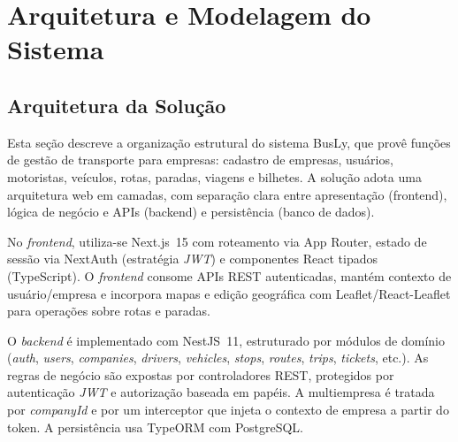 \chapter{Arquitetura e Modelagem do Sistema} \label{cha:arquitetura}

\section{Arquitetura da Solução}
Esta seção descreve a organização estrutural do sistema BusLy, que provê funções de gestão de transporte para empresas: cadastro de empresas, usuários, motoristas, veículos, rotas, paradas, viagens e bilhetes. A solução adota uma arquitetura web em camadas, com separação clara entre apresentação (frontend), lógica de negócio e APIs (backend) e persistência (banco de dados).

No \textit{frontend}, utiliza-se Next.js~15 com roteamento via App Router, estado de sessão via NextAuth (estratégia \textit{JWT}) e componentes React tipados (TypeScript). O \textit{frontend} consome APIs REST autenticadas, mantém contexto de usuário/empresa e incorpora mapas e edição geográfica com Leaflet/React-Leaflet para operações sobre rotas e paradas.

O \textit{backend} é implementado com NestJS~11, estruturado por módulos de domínio (\textit{auth}, \textit{users}, \textit{companies}, \textit{drivers}, \textit{vehicles}, \textit{stops}, \textit{routes}, \textit{trips}, \textit{tickets}, etc.). As regras de negócio são expostas por controladores REST, protegidos por autenticação \textit{JWT} e autorização baseada em papéis. A multiempresa é tratada por \textit{companyId} e por um interceptor que injeta o contexto de empresa a partir do token. A persistência usa TypeORM com PostgreSQL.

